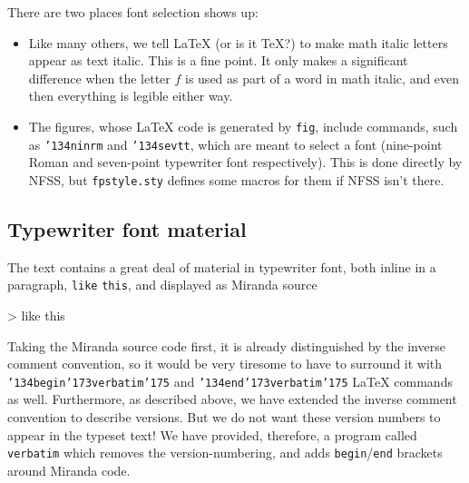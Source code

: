 There are two places font selection shows up:
\begin{itemize}
\item
Like many others, we tell \LaTeX{} (or is it \TeX{}?) to make math italic letters appear
as text italic.  
This is a fine point.  It only makes a significant difference when
the letter $f$ is used as part of a word in math italic,
and even then everything is legible either way.

\item
The figures, whose \LaTeX{} code is generated by \mbox{\tt fig}, include
commands, such as \mbox{\tt {\char'134}ninrm} and \mbox{\tt {\char'134}sevtt}, which are meant to select a
font (nine-point Roman and seven-point typewriter font respectively).
This is done directly by NFSS, but \mbox{\tt fpstyle.sty} defines some macros for them
if NFSS isn't there.
\end{itemize}

\subsection{Typewriter font material}

The text contains a great deal of material in typewriter font, both inline
in a paragraph, \mbox{\tt like} \mbox{\tt this}, and displayed as Miranda source

 > like this

Taking the Miranda source code first, it is already distinguished by 
the inverse comment convention,
so it would be very tiresome to have to surround it with
\mbox{\tt {\char'134}begin{\char'173}verbatim{\char'175}} and \mbox{\tt {\char'134}end{\char'173}verbatim{\char'175}} \LaTeX{} commands as well.
Furthermore, as described above, we have extended the inverse comment
convention to describe versions.  But we do not want these version numbers
to appear in the typeset text!  We have provided, therefore, a program
called \mbox{\tt verbatim} which removes the version-numbering, and adds \mbox{\tt begin}/\mbox{\tt end}
brackets around Miranda code.

